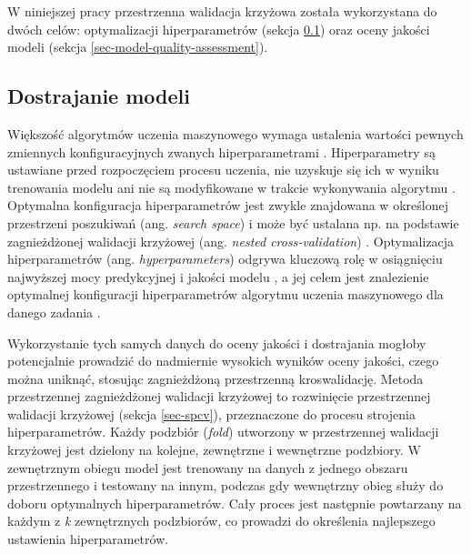 \documentclass{amuthesis}
\begin{document}
W niniejszej pracy przestrzenna walidacja krzyżowa została wykorzystana
do dwóch celów: optymalizacji hiperparametrów (sekcja \ref{sec-tuning})
oraz oceny jakości modeli (sekcja \ref{sec-model-quality-assessment}).

\hypertarget{sec-tuning}{%
\subsection{Dostrajanie modeli}\label{sec-tuning}}

Większość algorytmów uczenia maszynowego wymaga ustalenia wartości
pewnych zmiennych konfiguracyjnych zwanych hiperparametrami
\autocite{krol_2022_podstawy_ml}. Hiperparametry są ustawiane przed
rozpoczęciem procesu uczenia, nie uzyskuje się ich w wyniku trenowania
modelu ani nie są modyfikowane w trakcie wykonywania algorytmu
\autocite{krol_2022_podstawy_ml}. Optymalna konfiguracja hiperparametrów
jest zwykle znajdowana w określonej przestrzeni poszukiwań (ang.
\emph{search space}) i może być ustalana np. na podstawie zagnieżdżonej
walidacji krzyżowej (ang. \emph{nested cross-validation})
\autocite{lovelace_2019_geocomputation}. Optymalizacja hiperparametrów
(ang. \emph{hyperparameters}) odgrywa kluczową rolę w osiągnięciu
najwyższej mocy predykcyjnej i jakości modelu
\autocite{schratz_2019_hyperparameters}, a jej celem jest znalezienie
optymalnej konfiguracji hiperparametrów algorytmu uczenia maszynowego
dla danego zadania \autocite{bischl_2024_mlr3}.

Wykorzystanie tych samych danych do oceny jakości i dostrajania mogłoby
potencjalnie prowadzić do nadmiernie wysokich wyników oceny jakości,
czego można uniknąć, stosując zagnieżdżoną przestrzenną kroswalidację.
Metoda przestrzennej zagnieżdżonej walidacji krzyżowej to rozwinięcie
przestrzennej walidacji krzyżowej (sekcja \ref{sec-spcv}), przeznaczone
do procesu strojenia hiperparametrów. Każdy podzbiór (\emph{fold})
utworzony w przestrzennej walidacji krzyżowej jest dzielony na kolejne,
zewnętrzne i wewnętrzne podzbiory. W zewnętrznym obiegu model jest
trenowany na danych z jednego obszaru przestrzennego i testowany na
innym, podczas gdy wewnętrzny obieg służy do doboru optymalnych
hiperparametrów. Cały proces jest następnie powtarzany na każdym z
\emph{k} zewnętrznych podzbiorów, co prowadzi do określenia najlepszego
ustawienia hiperparametrów.
\end{document}
